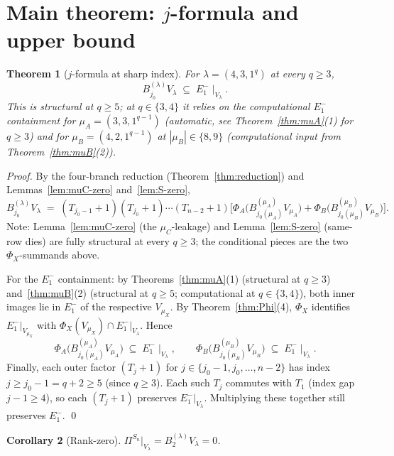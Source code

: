 \documentclass[11pt]{article}
\newtheorem{theorem}{Theorem}
\newtheorem{corollary}[theorem]{Corollary}
\theoremstyle{definition}
\begin{document}
\section{Main theorem: $j$-formula and upper bound}\label{sec:main}

\begin{theorem}[$j$-formula at sharp index]\label{thm:main-j}
For $\lambda = (4, 3, 1^q)$ at every $q \ge 3$,
\[
   B^{(\lambda)}_{j_0} V_\lambda \;\subseteq\; E_1^-\!\mid_{V_\lambda}.
\]
This is structural at $q \ge 5$; at $q \in \{3, 4\}$ it relies on the
computational $E_1^-$ containment for $\mu_A = (3, 3, 1^{q-1})$
(automatic, see Theorem~\ref{thm:muA}(1) for $q \ge 3$) and for
$\mu_B = (4, 2, 1^{q-1})$ at $|\mu_B| \in \{8, 9\}$
(computational input from Theorem~\ref{thm:muB}(2)).
\end{theorem}

\begin{proof}
By the four-branch reduction
(Theorem~\ref{thm:reduction}) and Lemmas~\ref{lem:muC-zero}
and~\ref{lem:S-zero},
\[
   B^{(\lambda)}_{j_0} V_\lambda
   \;=\;
   (T_{j_0-1}{+}1)(T_{j_0}{+}1)\cdots(T_{n-2}{+}1)
   \Big[ \Phi_A\big(B^{(\mu_A)}_{j_0(\mu_A)} V_{\mu_A}\big)
        + \Phi_B\big(B^{(\mu_B)}_{j_0(\mu_B)} V_{\mu_B}\big) \Big].
\]
Note: Lemma~\ref{lem:muC-zero} (the $\mu_C$-leakage) and
Lemma~\ref{lem:S-zero} (same-row dies) are fully structural at every
$q \ge 3$; the conditional pieces are the two $\Phi_X$-summands above.

For the $E_1^-$ containment: by Theorems~\ref{thm:muA}(1)
(structural at $q \ge 3$) and~\ref{thm:muB}(2)
(structural at $q \ge 5$; computational at $q \in \{3, 4\}$),
both inner images lie in $E_1^-$ of the respective $V_{\mu_X}$. By
Theorem~\ref{thm:Phi}(4), $\Phi_X$ identifies $E_1^-|_{V_{\mu_X}}$
with $\Phi_X(V_{\mu_X}) \cap E_1^-|_{V_\lambda}$. Hence
\[
   \Phi_A\big(B^{(\mu_A)}_{j_0(\mu_A)} V_{\mu_A}\big)
   \;\subseteq\; E_1^-\!\mid_{V_\lambda},
   \qquad
   \Phi_B\big(B^{(\mu_B)}_{j_0(\mu_B)} V_{\mu_B}\big)
   \;\subseteq\; E_1^-\!\mid_{V_\lambda}.
\]
Finally, each outer factor $(T_j{+}1)$ for $j \in \{j_0 - 1, j_0,
\ldots, n - 2\}$ has index $j \ge j_0 - 1 = q + 2 \ge 5$ (since
$q \ge 3$). Each such $T_j$ commutes with $T_1$ (index gap
$j - 1 \ge 4$), so each $(T_j{+}1)$ preserves $E_1^-|_{V_\lambda}$.
Multiplying these together still preserves $E_1^-$.
\qed
\end{proof}

\begin{corollary}[Rank-zero]\label{cor:rank-zero}
$\Pi^{S_n}|_{V_\lambda} = B^{(\lambda)}_2 V_\lambda = 0$.
\end{corollary}
\end{document}
